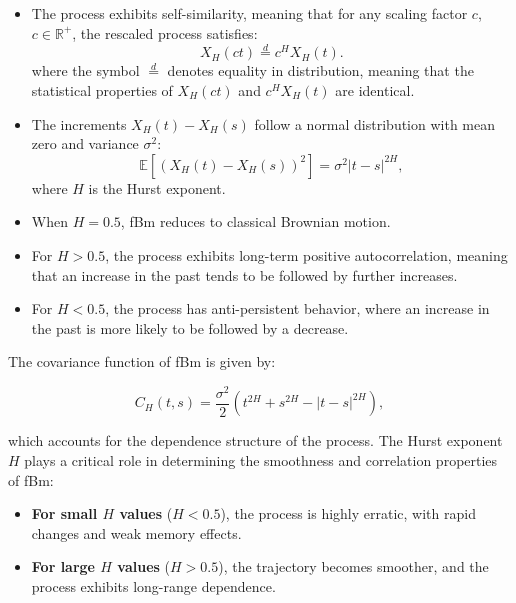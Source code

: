 \documentclass[11pt]{extarticle}
\begin{document}
\begin{itemize}
    \item The process exhibits self-similarity, meaning that for any scaling factor \( c \), \( c \in \mathbb{R}^+ \), the rescaled process satisfies:
    \begin{equation}
        X_H(ct) \overset{d}{=} c^H X_H(t).
    \end{equation}
    where the symbol \(\stackrel{d}{=}\) denotes equality in distribution, meaning that the statistical properties of \(X_H(ct)\) and \(c^H X_H(t)\) are identical.

    \item The increments \( X_H(t) - X_H(s) \) follow a normal distribution with mean zero and variance \( \sigma^2 \):
    \begin{equation}
        \mathbb{E} \left[ (X_H(t) - X_H(s))^2 \right] = \sigma^2|t - s|^{2H},
    \end{equation}
    where \( H \) is the Hurst exponent.

    \item When \( H = 0.5 \), fBm reduces to classical Brownian motion.
    \item For \( H > 0.5 \), the process exhibits long-term positive autocorrelation, meaning that an increase in the past tends to be followed by further increases.
    \item For \( H < 0.5 \), the process has anti-persistent behavior, where an increase in the past is more likely to be followed by a decrease.
\end{itemize}

The covariance function of fBm is given by:

\begin{equation}
    C_H(t, s) = \frac{\sigma^2}{2} \left( t^{2H} + s^{2H} - |t - s|^{2H} \right),
    \label{eq:fbm_covariance}
\end{equation}

which accounts for the dependence structure of the process. The Hurst exponent \( H \) plays a critical role in determining the smoothness and correlation properties of fBm:

\begin{itemize}
    \item \textbf{For small \( H \) values} (\( H < 0.5 \)), the process is highly erratic, with rapid changes and weak memory effects.
    \item \textbf{For large \( H \) values} (\( H > 0.5 \)), the trajectory becomes smoother, and the process exhibits long-range dependence.
\end{itemize}
\end{document}
